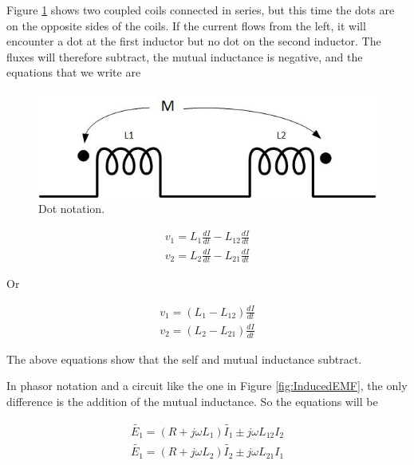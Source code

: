 \documentclass{ximera}
\begin{document}
Figure \ref{fig:DotNotation2} shows two coupled coils connected in series, but this time the dots are on the opposite sides of the coils. If the current flows from the left, it will encounter a dot at the first inductor but no dot on the second inductor. The fluxes will  therefore subtract, the mutual inductance is negative, and the equations that we write are

 


\begin{figure}[htbp]
\begin{center}
\includegraphics[scale=0.8]{../jpg/CoupledCoilsCircuit2.jpg}
\end{center}
\caption{Dot notation.}
\label{fig:DotNotation2}
\end{figure}

\begin{eqnarray}
v_1=  L_1 \frac{dI}{dt} - L_{12} \frac{dI}{dt} \\
v_2= L_2 \frac{dI}{dt} - L_{21} \frac{dI}{dt}
\end{eqnarray}


Or

\begin{eqnarray}
v_1=  (L_1  - L_{12}) \frac{dI}{dt} \\
v_2= (L_2 - L_{21}) \frac{dI}{dt}
\end{eqnarray}




The above equations show that the self and mutual inductance subtract.



In phasor notation and a circuit like the one in Figure \ref{fig:InducedEMF}, the only difference is the addition of the mutual inductance. So the equations will be



\begin{eqnarray}
\tilde{E_1} = (R + j \omega L_1) \tilde{I_1} \pm j \omega L_{12} I_2 \\
\tilde{E_1} = (R + j \omega L_2) \tilde{I_2} \pm j \omega L_{21} I_1 
\end{eqnarray}
\end{document}
